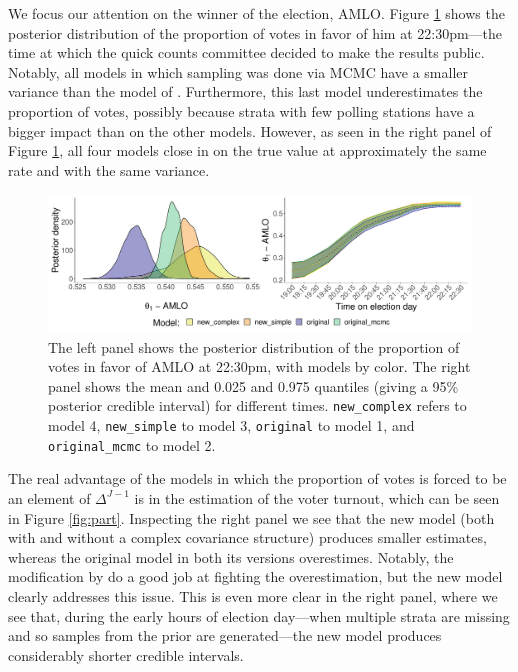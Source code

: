 \documentclass{article}
\begin{document}
We focus our attention on the winner of the election, AMLO. Figure \ref{fig:amlo} shows the posterior distribution of the proportion of votes in favor of him at 22:30pm---the time at which the quick counts committee decided to make the results public. Notably, all models in which sampling was done via MCMC have a smaller variance than the model of \citet{diluvi2018}. Furthermore, this last model underestimates the proportion of votes, possibly because strata with few polling stations have a bigger impact than on the other models. However, as seen in the right panel of Figure \ref{fig:amlo}, all four models close in on the true value at approximately the same rate and with the same variance. \\


\begin{figure}[h]
  \centering
  \includegraphics[width=\textwidth]{../fig/amlo.pdf}
  \caption{The left panel shows the posterior distribution of the proportion of votes in favor of AMLO at 22:30pm, with models by color. The right panel shows the mean and 0.025 and 0.975 quantiles (giving a 95\% posterior credible interval) for different times. \texttt{new\_complex} refers to model 4, \texttt{new\_simple} to model 3, \texttt{original} to model 1, and \texttt{original\_mcmc} to model 2.}
  \label{fig:amlo}
\end{figure}


The real advantage of the models in which the proportion of votes is forced to be an element of $\Delta^{J-1}$ is in the estimation of the voter turnout, which can be seen in Figure \ref{fig:part}. Inspecting the right panel we see that the new model (both with and without a complex covariance structure) produces smaller estimates, whereas the original model in both its versions overestimes. Notably, the modification by \citet{diluvi2018} do a good job at fighting the overestimation, but the new model clearly addresses this issue. This is even more clear in the right panel, where we see that, during the early hours of election day---when multiple strata are missing and so samples from the prior are generated---the new model produces considerably shorter credible intervals. \\
\end{document}
